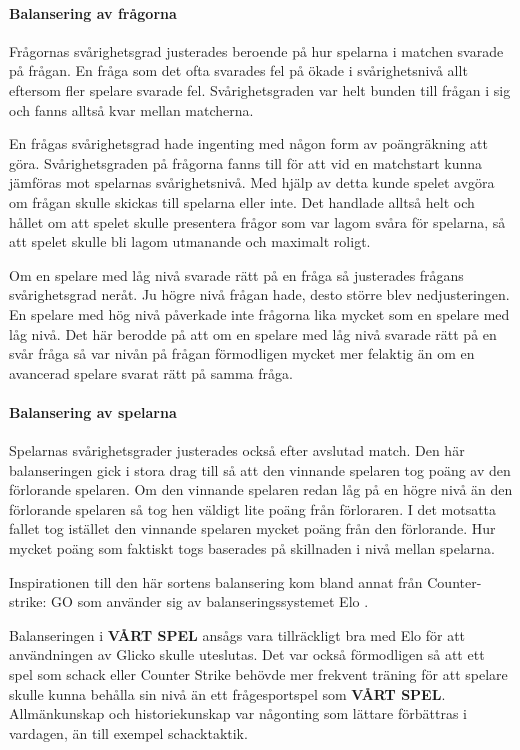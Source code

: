 \documentclass[a4paper, 11pt]{article}
\begin{document}
\paragraph{Balansering av frågorna}

Frågornas svårighetsgrad justerades beroende på hur spelarna i matchen svarade på frågan. En fråga som det ofta svarades fel på ökade i svårighetsnivå allt eftersom fler spelare svarade fel. Svårighetsgraden var helt bunden till frågan i sig och fanns alltså kvar mellan matcherna.

En frågas svårighetsgrad hade ingenting med någon form av poängräkning att göra. Svårighetsgraden på frågorna fanns till för att vid en matchstart kunna jämföras mot spelarnas svårighetsnivå. Med hjälp av detta kunde spelet avgöra om frågan skulle skickas till spelarna eller inte. Det handlade alltså helt och hållet om att spelet skulle presentera frågor som var lagom svåra för spelarna, så att spelet skulle bli lagom utmanande och maximalt roligt.

Om en spelare med låg nivå svarade rätt på en fråga så justerades frågans svårighetsgrad neråt. Ju högre nivå frågan hade, desto större blev nedjusteringen. En spelare med hög nivå påverkade inte frågorna lika mycket som en spelare med låg nivå. Det här berodde på att om en spelare med låg nivå svarade rätt på en svår fråga så var nivån på frågan förmodligen mycket mer felaktig än om en avancerad spelare svarat rätt på samma fråga. 

\paragraph{Balansering av spelarna}

Spelarnas svårighetsgrader justerades också efter avslutad match. Den här balanseringen gick i stora drag till så att den vinnande spelaren tog poäng av den förlorande spelaren. Om den vinnande spelaren redan låg på en högre nivå än den förlorande spelaren så tog hen väldigt lite poäng från förloraren. I det motsatta fallet tog istället den vinnande spelaren mycket poäng från den förlorande. Hur mycket poäng som faktiskt togs baserades på skillnaden i nivå mellan spelarna. 

Inspirationen till den här sortens balansering kom bland annat från Counter-strike: GO \cite{cs} som använder sig av balanseringssystemet Elo \cite{elo}. 

Balanseringen i \textbf{VÅRT SPEL} ansågs vara tillräckligt bra med Elo för att användningen av Glicko skulle uteslutas. Det var också förmodligen så att ett spel som schack eller Counter Strike behövde mer frekvent träning för att spelare skulle kunna behålla sin nivå än ett frågesportspel som \textbf{VÅRT SPEL}. Allmänkunskap och historiekunskap var någonting som lättare förbättras i vardagen, än till exempel schacktaktik. 
\end{document}
